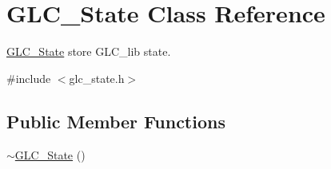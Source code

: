 \hypertarget{class_g_l_c___state}{\section{G\-L\-C\-\_\-\-State Class Reference}
\label{class_g_l_c___state}
}


\hyperlink{class_g_l_c___state}{G\-L\-C\-\_\-\-State} store G\-L\-C\-\_\-lib state.  




{\ttfamily \#include $<$glc\-\_\-state.\-h$>$}

\subsection*{Public Member Functions}
\begin{DoxyCompactItemize}
\item 
\hyperlink{class_g_l_c___state_a1bb9b5ea0f77eef94ef8ee3faee6d24c}{$\sim$\-G\-L\-C\-\_\-\-State} ()
\end{DoxyCompactItemize}
